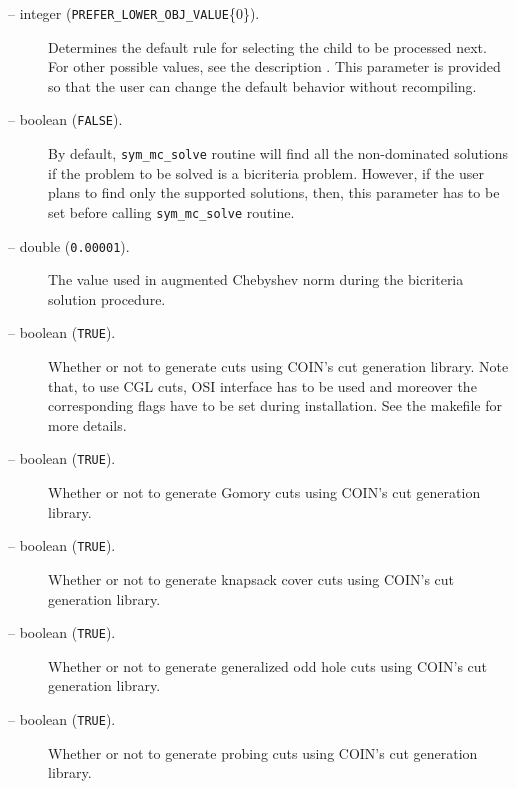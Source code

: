 \begin{description}
\item[ -- integer 
({\tt PREFER\_LOWER\_OBJ\_VALUE}\{0\}).] 
Determines the default rule for selecting the child to be processed
next. For other possible values, see the description . This
parameter is provided so that the user can change the default behavior
without recompiling.

\item[ -- boolean ({\tt FALSE}).] 
By default, {\tt sym\_mc\_solve} routine will find all the non-dominated 
solutions if the problem to be solved is 
a bicriteria problem. However, if the user plans to find only the supported 
solutions, then, this parameter has to be set before 
calling {\tt sym\_mc\_solve} routine. 

\item[ -- double ({\tt 0.00001}).] 
The value used in augmented Chebyshev norm during the bicriteria 
solution procedure.

\item[ -- boolean ({\tt TRUE}).] 
Whether or not to generate cuts using COIN's cut generation library. 
Note that, to use CGL cuts, OSI interface has to be used and moreover the 
corresponding flags have to be set during installation. See the makefile for 
more details.

\item[ -- boolean ({\tt TRUE}).] 
Whether or not to generate Gomory cuts using COIN's cut generation library. 

\item[ -- boolean ({\tt TRUE}).] 
Whether or not to generate knapsack cover cuts using COIN's cut generation 
library. 

\item[ -- boolean ({\tt TRUE}).] 
Whether or not to generate generalized odd hole cuts using COIN's cut 
generation library. 

\item[ -- boolean ({\tt TRUE}).] 
Whether or not to generate probing cuts using COIN's cut generation library. 


\end{description}
